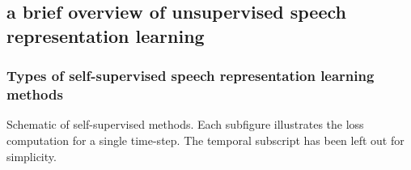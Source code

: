 \subsection[A Brief Overview of Unsupervised Speech Representation Learning]{a brief overview of unsupervised speech representation learning}


\begin{frame}
    \frametitle{Types of self-supervised speech representation learning methods}
    
    Schematic of self-supervised methods. Each subfigure illustrates the loss computation for a single time-step. The temporal subscript has been left out for simplicity.

    \begin{figure}
        \centering
        \setlength\tabcolsep{1.5pt}
    \end{figure}
\end{frame}



